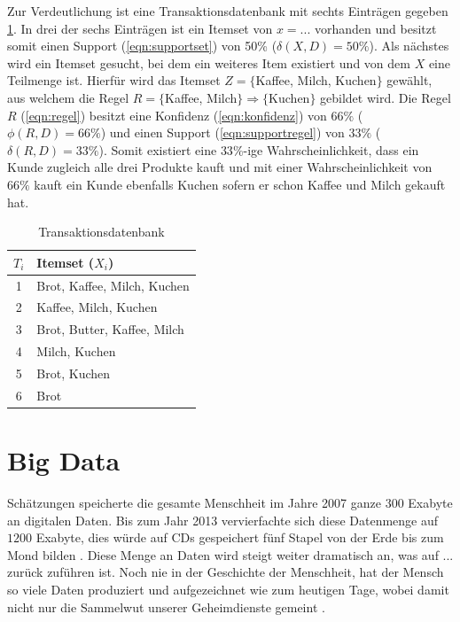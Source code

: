 \documentclass[12pt,journal,compsoc,ngerman]{IEEEtran}
\begin{document}
Zur Verdeutlichung ist eine Transaktionsdatenbank mit sechts Einträgen gegeben \cref{tab:database}. 
In drei 
der sechs Einträgen ist ein Itemset von $x = ... $ vorhanden und besitzt somit einen Support (\cref{eqn:supportset}) von 50\% ($\delta(X, D) = 50\%$). 
Als nächstes wird ein Itemset
gesucht, bei dem ein weiteres Item existiert und von dem $X$ eine Teilmenge ist. Hierfür wird das Itemset $Z = \{$Kaffee, Milch, Kuchen$\}$ gewählt, aus welchem die Regel 
$R = \{$Kaffee, Milch$\}\Rightarrow\{$Kuchen$\}$ gebildet wird. Die Regel $R$ (\cref{eqn:regel}) besitzt eine Konfidenz (\cref{eqn:konfidenz}) von $66\%$ ($\phi(R, D) = 66\%$) und einen Support (\cref{eqn:supportregel}) von $33\%$
($\delta(R, D) = 33\%$). 
Somit existiert eine $33\%$-ige Wahrscheinlichkeit, dass ein Kunde zugleich alle drei Produkte kauft und mit einer Wahrscheinlichkeit von  $66\%$ kauft ein Kunde ebenfalls Kuchen sofern er schon Kaffee und Milch gekauft hat.
\begin{table}[!t]
\caption{Transaktionsdatenbank}
\centering
\label{tab:database}
\begin{tabular}{c|l}
    	    $T_i$ & Itemset ($X_i$)\\ \hline
    	    1 & Brot, Kaffee, Milch, Kuchen\\
    	    2 & Kaffee, Milch, Kuchen\\
    	    3 & Brot, Butter, Kaffee, Milch\\
    	    4 & Milch, Kuchen\\
    	    5 & Brot, Kuchen\\
    	    6 & Brot
    	    \end{tabular}

\end{table}
  
 \section{Big Data}
  Schätzungen speicherte die gesamte Menschheit im Jahre 2007 ganze $300$
 Exabyte an digitalen Daten. Bis zum Jahr 2013 vervierfachte sich diese Datenmenge auf $1200$ Exabyte, 
dies würde auf CDs gespeichert fünf Stapel von der Erde bis zum Mond bilden \cite{mayer2014big}. 
Diese Menge an Daten wird steigt weiter dramatisch an, was auf ... %
zurück zuführen ist.
Noch nie in der Geschichte der Menschheit, hat der 
Mensch so viele Daten produziert und aufgezeichnet wie zum heutigen Tage, wobei damit nicht nur die Sammelwut 
unserer Geheimdienste gemeint \cite{nsa_classification_cuide}. %
 
\end{document}
